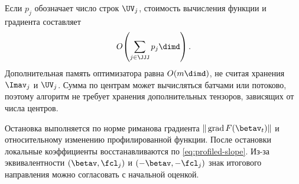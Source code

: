 Если $p_j$ обозначает число строк $\UV_j$, стоимость вычисления функции и
градиента составляет
\begin{equation}
 O\!\left(\sum_{j\in\JJJ}p_j\dimd\right).
\end{equation}
Дополнительная память оптимизатора равна $O(m\dimd)$, не считая хранения
$\Imav_j$ и $\UV_j$. Сумма по центрам может вычисляться батчами или
потоково, поэтому алгоритм не требует хранения дополнительных тензоров,
зависящих от числа центров.

Остановка выполняется по норме риманова градиента
$\|\operatorname{grad}F(\betav_t)\|$ и относительному изменению
профилированной функции. После остановки локальные коэффициенты
восстанавливаются по \eqref{eq:profiled-slope}. Из-за эквивалентности
$(\betav,\fcl_j)$ и $(-\betav,-\fcl_j)$ знак итогового направления можно
согласовать с начальной оценкой.
